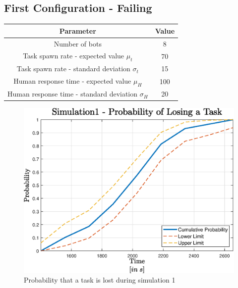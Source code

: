 \documentclass[10pt,a4paper]{article}
\begin{document}
		\subsection{First Configuration - Failing}
			\label{sub:sim1}
			\begin{center}
				\begin{tabular}{ |c|c|}
					\hline
					Parameter & Value \\
					\hline
					\hline
					Number of bots & 8\\
					\hline
					Task spawn rate - expected value $\mu_t$ & 70\\
					\hline					
					Task spawn rate - standard deviation $\sigma_t$ & 15\\
					\hline
					Human response time - expected value $\mu_H$ & 100\\
					\hline					
					Human response time - standard deviation $\sigma_H$ & 20\\
					\hline
				\end{tabular}
			\end{center}
			\begin{figure}[H]
				\centering
					\includegraphics[scale = 0.7]{Images/Simulation1}
					\caption{Probability that a task is lost during simulation 1}
					\label{fig:sim1}
			\end{figure}
		
\end{document}
